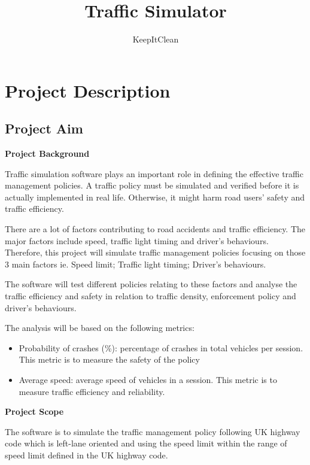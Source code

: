 \documentclass[11pt]{article}
\author{KeepItClean}
\title{Traffic Simulator}
\begin{document}
\maketitle

\section{Project Description}
\subsection{Project Aim}
\begin{flushleft}
\textbf{Project Background}\par	
\end{flushleft}

Traffic simulation software plays an important role in defining the effective traffic management policies. A traffic policy must be simulated and verified before it is actually implemented in real life. Otherwise, it might harm road users’ safety and traffic efficiency.

There are a lot of factors contributing to road accidents and traffic efficiency. The major factors include speed, traffic light timing and driver’s behaviours. Therefore, this project will simulate traffic management policies focusing on those 3 main factors ie. Speed limit; Traffic light timing; Driver’s behaviours.

The software will test different policies relating to these factors and analyse the traffic efficiency and safety in relation to traffic density, enforcement policy and driver’s behaviours.

The analysis will be based on the following metrics:
\begin{itemize}
	\item Probability of crashes (\%): percentage of crashes in total vehicles per session. This metric is to measure the safety of the policy
	\item Average speed: average speed of vehicles in a session. This metric is to measure traffic efficiency and reliability.
\end{itemize}

\begin{flushleft}
\textbf{Project Scope} \par	
\end{flushleft}

The software is to simulate the traffic management policy following UK highway code which is left-lane oriented and using the speed limit within the range of speed limit defined in the UK highway code.
\end{document}
